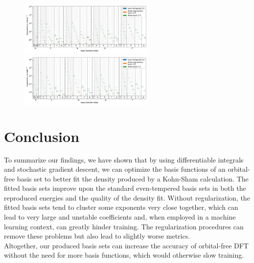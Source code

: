 


\begin{figure}
   \centering
   \includegraphics[width=0.6\textwidth]{chapters/results/results_images/basis_functions_with_size2.5}
   \includegraphics[width=0.6\textwidth]{chapters/results/results_images/basis_functions_with_size3.0}
    \caption{}
\end{figure}
\section{Conclusion}
To summarize our findings, we have shown that by using differentiable integrals and stochastic gradient descent, we can optimize the basis functions of an orbital-free basis set to better fit the density produced by a Kohn-Sham calculation. The fitted basis sets improve upon the standard even-tempered basis sets in both the reproduced energies and the quality of the density fit. Without regularization, the fitted basis sets tend to cluster some exponents very close together, which can lead to very large and unstable coefficients and, when employed in a machine learning context, can greatly hinder training. The regularization procedures can remove these problems but also lead to slightly worse metrics.\\
Altogether, our produced basis sets can increase the accuracy of orbital-free DFT without the need for more basis functions, which would otherwise slow training.










